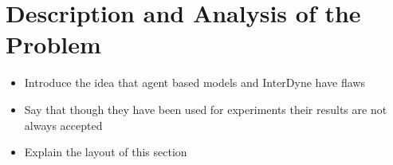 \documentclass{article}
\begin{document}





\section {Description and Analysis of the Problem} \label{despriptionandanalysproblem}
\begin{itemize}
  \item Introduce the idea that agent based models and InterDyne have flaws
  \item Say that though they have been used for experiments their results are not always accepted 
  \item Explain the layout of this section 
\end{itemize}
\end{document}

